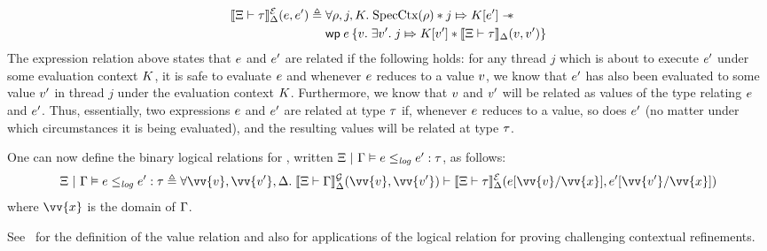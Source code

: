 \begin{align*}
  \semEtype{\Tenv}{\typ}{\semenv}(\expr, \expr') \eqdef{}
  & \forall \cfgg, j, \lctx.\; \SpecCtx(\cfgg) \ast j \Mapsto \lctx[\expr'] \wand\\
  & \wpre{\expr}{\val.\;
    \exists \val'.\; j \Mapsto \lctx[\val'] \ast \semVtype{\Tenv}{\typ}{\semenv}(\val, \val')} \\
\end{align*}
The expression relation above states that $e$ and $e'$ are
related if the following holds: for any thread $j$ which is about to
execute $e'$ under some evaluation context $K$, it is safe to
evaluate $e$ and whenever $e$ reduces to a value $v$, we
know that $e'$ has also been evaluated to some value $v'$ in
thread $j$ under the evaluation context $K$. Furthermore, we know
that $v$ and $v'$ will be related as values of the type relating
$e$ and $e'$. Thus, essentially, two expressions $e$ and
$e'$ are related at type $\tau$ if, whenever $e$ reduces to a
value, so does $e'$ (no matter under which circumstances it is
being evaluated), and the resulting values will be related at type
$\tau$.

One can now define the binary logical relations for \TheLang{}, written
$\Xi ~|~ \Gamma \vDash e \le_{\mathit{log}} e' : \tau$, as follows:
\[\semtyped{\Tenv}{\env}{\expr \lelog \expr'}{\typ} \eqdef{} \forall
  \vv{\val}, \vv{\val'}, \semenv.\;
  \semGtype{\Tenv}{\env}{\semenv}(\vv{\val}, \vv{\val'}) \proves
  \semEtype{\Tenv}{\typ}{\semenv}(\subst{\expr}{\vv{\var}}{\vv{\val}},
  \subst{\expr'}{\vv{\var}}{\vv{\val'}}) \] where $\vv{\var}$ is the
domain of $\Gamma$.

See~\cite{timany:logrel-in-iris} for the definition of the value relation and also
for applications of the logical relation for proving challenging
contextual refinements.

